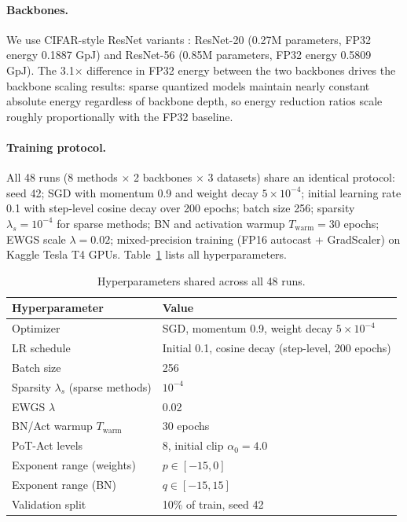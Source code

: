 \documentclass[12pt]{article}
\begin{document}
\paragraph{Backbones.} We use CIFAR-style ResNet variants \cite{he2016resnet}: ResNet-20 (0.27M parameters, FP32 energy 0.1887 GpJ) and ResNet-56 (0.85M parameters, FP32 energy 0.5809 GpJ). The 3.1$\times$ difference in FP32 energy between the two backbones drives the backbone scaling results: sparse quantized models maintain nearly constant absolute energy regardless of backbone depth, so energy reduction ratios scale roughly proportionally with the FP32 baseline.

\paragraph{Training protocol.} All 48 runs (8 methods $\times$ 2 backbones $\times$ 3 datasets) share an identical protocol: seed 42; SGD with momentum 0.9 and weight decay $5 \times 10^{-4}$; initial learning rate 0.1 with step-level cosine decay over 200 epochs; batch size 256; sparsity $\lambda_s = 10^{-4}$ for sparse methods; BN and activation warmup $T_\mathrm{warm} = 30$ epochs; EWGS scale $\lambda = 0.02$; mixed-precision training \cite{micikevicius2018mixed} (FP16 autocast + GradScaler) on Kaggle Tesla T4 GPUs. Table~\ref{tab:hyperparams} lists all hyperparameters.

\begin{table}[H]
\centering
\small
\caption{Hyperparameters shared across all 48 runs.}
\label{tab:hyperparams}
\begin{tabular}{@{}ll@{}}
\toprule
Hyperparameter & Value \\
\midrule
Optimizer & SGD, momentum 0.9, weight decay $5 \times 10^{-4}$ \\
LR schedule & Initial 0.1, cosine decay (step-level, 200 epochs) \\
Batch size & 256 \\
Sparsity $\lambda_s$ (sparse methods) & $10^{-4}$ \\
EWGS $\lambda$ & 0.02 \\
BN/Act warmup $T_\mathrm{warm}$ & 30 epochs \\
PoT-Act levels & 8, initial clip $\alpha_0 = 4.0$ \\
Exponent range (weights) & $p \in [-15, 0]$ \\
Exponent range (BN) & $q \in [-15, 15]$ \\
Validation split & 10\% of train, seed 42 \\
\bottomrule
\end{tabular}
\end{table}
\end{document}
